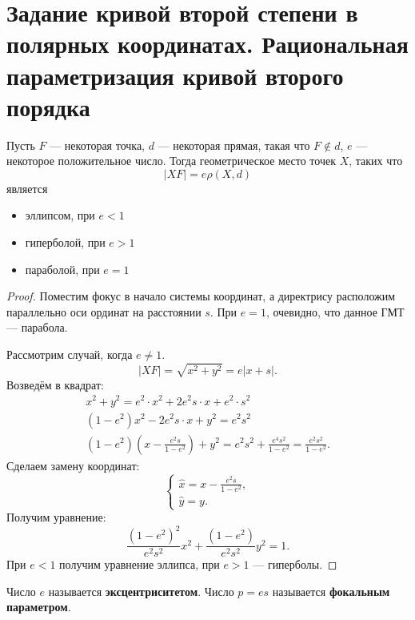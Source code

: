 \section{Задание кривой второй степени в полярных координатах. Рациональная параметризация кривой второго порядка}

\begin{theorem}
    Пусть $F$ --- некоторая точка, $d$ --- некоторая прямая, такая что $F \notin d$, $e$ --- некоторое положительное число. Тогда геометрическое место точек $X$, таких что
    $$
    |XF| = e\rho(X, d)
    $$
    является
    \begin{itemize}
        \item эллипсом, при $e < 1$
        \item гиперболой, при $e > 1$
        \item параболой, при $e = 1$
    \end{itemize}
\end{theorem}

\begin{proof}
    Поместим фокус в начало системы координат, а директрису расположим параллельно оси ординат на расстоянии $s$. При $e = 1$, очевидно, что данное ГМТ --- парабола.

    Рассмотрим случай, когда $e \ne 1$.
    $$
    |XF| = \sqrt{x^2 + y^2} = e|x + s|.
    $$
    Возведём в квадрат:
    $$
    \begin{array}{c}\displaystyle
        x^2 + y^2 = e^2\cdot x^2 + 2e^2s\cdot x + e^2\cdot s^2\\\displaystyle
        (1 - e^2)x^2 - 2e^2s\cdot x + y^2 = e^2s^2\\\displaystyle
        (1 - e^2)\left(x - \frac{e^2s}{1 - e^2}\right) + y^2 = e^2s^2 + \frac{e^4s^2}{1 - e^2} = \frac{e^2s^2}{1 - e^2}.
    \end{array}
    $$
    Сделаем замену координат:
    $$
    \begin{cases}\displaystyle
        \widehat{x} = x - \frac{e^2s}{1 - e^2},\\\displaystyle
        \widehat{y} = y.
    \end{cases}
    $$
    Получим уравнение:
    $$
    \frac{(1 - e^2)^2}{e^2s^2}x^2 + \frac{(1 - e^2)}{e^2s^2}y^2 = 1.
    $$
    При $e < 1$ получим уравнение эллипса, при $e > 1$ --- гиперболы.
\end{proof}

\begin{definition}
    Число $e$ называется \textbf{эксцентриситетом}. Число $p = es$ называется \textbf{фокальным параметром}.
\end{definition}

